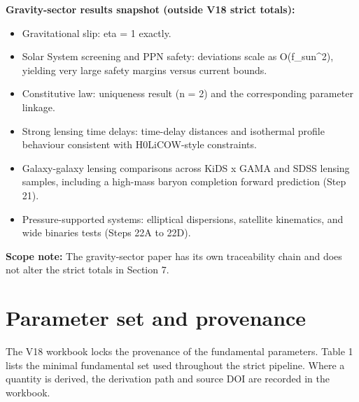 \documentclass[11pt,a4paper]{article}
\begin{document}
\begin{mdframed}[linecolor=accent,linewidth=0.5pt,backgroundcolor=callout-bg,leftline=true,rightline=true,topline=true,bottomline=true,innerleftmargin=8pt,innerrightmargin=8pt,innertopmargin=6pt,innerbottommargin=6pt]
\textbf{Gravity-sector results snapshot (outside V18 strict totals):}\begin{itemize}
  \item Gravitational slip: eta = 1 exactly.
  \item Solar System screening and PPN safety: deviations scale as O(f\_\allowbreak{}sun\^{}2), yielding very large safety margins versus current bounds.
  \item Constitutive law: uniqueness result (n = 2) and the corresponding parameter linkage.
  \item Strong lensing time delays: time-delay distances and isothermal profile behaviour consistent with H0LiCOW-style constraints.
  \item Galaxy-galaxy lensing comparisons across KiDS x GAMA and SDSS lensing samples, including a high-mass baryon completion forward prediction (Step 21).
  \item Pressure-supported systems: elliptical dispersions, satellite kinematics, and wide binaries tests (Steps 22A to 22D).
\end{itemize}
\end{mdframed}

\textbf{Scope note:} The gravity-sector paper has its own traceability chain and does not alter the strict totals in Section 7.

\section{Parameter set and provenance}
\label{sec:sec5}
The V18 workbook locks the provenance of the fundamental parameters. Table 1 lists the minimal fundamental set used throughout the strict pipeline. Where a quantity is derived, the derivation path and source DOI are recorded in the workbook.
\end{document}
